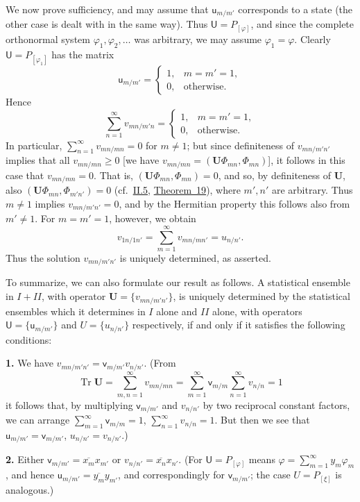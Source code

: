 \documentclass[fontsize=13pt,twoside,openany,headings=normal,parskip=false,bookmarkpackage=false,DIV=calc]{scrbook}
\begin{document}
We now prove sufficiency, and may assume that $\mathsf u_{m/m'}$ corresponds to a state (the other case is dealt with in the same way). Thus $\mathsf U=P_{[\varphi]}$, and since the complete orthonormal system $\varphi_1,\varphi_2,\ldots$ was arbitrary, we may assume $\varphi_1=\varphi$. Clearly $\mathsf U=P_{[\varphi_1]}$ has the matrix
\[
 \mathsf u_{m/m'}=\begin{cases}1,&m=m'=1,\\0,&\text{otherwise}.\end{cases}
\]
Hence
\[
 \sum_{n=1}^{\infty}v_{mn/m'n}
 =\begin{cases}1,&m=m'=1,\\0,&\text{otherwise}.\end{cases}
\]
In particular, $\sum_{n=1}^{\infty}v_{mn/mn}=0$ for $m\ne1$; but since definiteness of $v_{mn/m'n'}$ implies that all $v_{mn/mn}\geq0$ [we have $v_{mn/mn}=(\boldsymbol U\Phi_{mn},\Phi_{mn})$], it follows in this case that $v_{mn/mn}=0$. That is, $(\boldsymbol U\Phi_{mn},\Phi_{mn})=0$, and so, by definiteness of $\boldsymbol U$, also $(\boldsymbol U\Phi_{mn},\Phi_{m'n'})=0$ (cf.\ \hyperref[sec:II.5]{II.5}, \hyperref[thm:II.19]{Theorem~19}), where $m',n'$ are arbitrary. Thus $m\ne1$ implies $v_{mn/m'n'}=0$, and by the Hermitian property this follows also from $m'\ne1$. For $m=m'=1$, however, we obtain
\[
 v_{1n/1n'}=\sum_{m=1}^{\infty}v_{mn/mn'}=u_{n/n'}.
\]
Thus the solution $v_{mn/m'n'}$ is uniquely determined, as asserted.

To summarize, we can also formulate our result as follows. A statistical ensemble in $I+II$, with operator $\boldsymbol U=\{v_{mn/m'n'}\}$, is uniquely determined by the statistical ensembles which it determines in $I$ alone and $II$ alone, with operators $\mathsf U=\{\mathsf u_{m/m'}\}$ and $U=\{u_{n/n'}\}$ respectively, if and only if it satisfies the following conditions:

\textbf{1.} We have $v_{mn/m'n'}=\mathsf v_{m/m'}v_{n/n'}$. (From
\[
 \operatorname{Tr}\boldsymbol U=\sum_{m,n=1}^{\infty}v_{mn/mn}
 =\sum_{m=1}^{\infty}\mathsf v_{m/m}\sum_{n=1}^{\infty}v_{n/n}=1
\]
it follows that, by multiplying $\mathsf v_{m/m'}$ and $v_{n/n'}$ by two reciprocal constant factors, we can arrange $\sum_{m=1}^{\infty}\mathsf v_{m/m}=1$, $\sum_{n=1}^{\infty}v_{n/n}=1$.
\hypertarget{origpage-229}{}%
But then we see that $\mathsf u_{m/m'}=\mathsf v_{m/m'}$, $u_{n/n'}=v_{n/n'}$.)

\textbf{2.} Either $\mathsf v_{m/m'}=\overline{x_m}x_{m'}$ or $v_{n/n'}=\overline{x_n}x_{n'}$. (For $\mathsf U=P_{[\varphi]}$ means $\varphi=\sum_{m=1}^{\infty}y_m\varphi_m$, and hence $\mathsf u_{m/m'}=\overline{y_m}y_{m'}$, and correspondingly for $\mathsf v_{m/m'}$; the case $U=P_{[\xi]}$ is analogous.)
\end{document}
